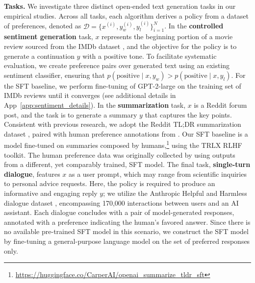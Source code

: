 \textbf{Tasks.} We investigate three distinct open-ended text generation tasks in our empirical studies. Across all tasks, each algorithm derives a policy from a dataset of preferences, denoted as $\mathcal{D}=\bigl\{x^{(i)}, y_w^{(i)}, y_l^{(i)}\bigr\}_{i=1}^N$. In the \textbf{controlled sentiment generation} task, $x$ represents the beginning portion of a movie review sourced from the IMDb dataset \cite{maas-EtAl:2011:ACL-HLT2011}, and the objective for the policy is to generate a continuation $y$ with a positive tone. To facilitate systematic evaluation, we create preference pairs over generated text using an existing sentiment classifier, ensuring that $p(\text{positive}\mid x,y_w)>p(\text{positive}\mid x,y_l)$. For the SFT baseline, we perform fine-tuning of GPT-2-large on the training set of IMDb reviews until it converges (see additional details in App~\ref{app:sentiment_details}). In the \textbf{summarization} task, $x$ is a Reddit forum post, and the task is to generate a summary $y$ that captures the key points. Consistent with previous research, we adopt the Reddit TL;DR summarization dataset \citep{volske-etal-2017-tl}, paired with human preference annotations from \citeauthor{stiennon2022learning}. Our SFT baseline is a model fine-tuned on summaries composed by humans,\footnote{\url{https://huggingface.co/CarperAI/openai_summarize_tldr_sft}} using the TRLX \citep{leandro_von_werra_2023_7790115} RLHF toolkit. The human preference data was originally collected by \citeauthor{stiennon2022learning} using outputs from a different, yet comparably trained, SFT model. The final task, \textbf{single-turn dialogue}, features $x$ as a user prompt, which may range from scientific inquiries to personal advice requests. Here, the policy is required to produce an informative and engaging reply $y$; we utilize the Anthropic Helpful and Harmless dialogue dataset \citep{bai2022training}, encompassing 170,000 interactions between users and an AI assistant. Each dialogue concludes with a pair of model-generated responses, annotated with a preference indicating the human’s favored answer. Since there is no available pre-trained SFT model in this scenario, we construct the SFT model by fine-tuning a general-purpose language model on the set of preferred responses only.

